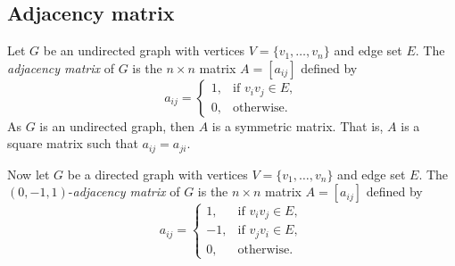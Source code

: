 \subsection{Adjacency matrix}

Let $G$ be an undirected graph with vertices
$V = \{ v_1, \dots, v_n \}$ and edge set $E$. The
\emph{adjacency matrix} of $G$ is the $n \times n$ matrix
$A = [a_{ij}]$ defined by
\[
a_{ij}
=
\begin{cases}
1, & \text{if $v_i v_j \in E$}, \\
0, & \text{otherwise}.
\end{cases}
\]
As $G$ is an undirected graph, then $A$ is a symmetric matrix. That
is, $A$ is a square matrix such that $a_{ij} = a_{ji}$.

Now let $G$ be a directed graph with vertices
$V = \{ v_1, \dots, v_n \}$ and edge set $E$. The
$(0, -1, 1)$-\emph{adjacency matrix} of $G$ is the $n \times n$ matrix
$A = [a_{ij}]$ defined by
\[
a_{ij}
=
\begin{cases}
1,  & \text{if $v_i v_j \in E$}, \\
-1, & \text{if $v_j v_i \in E$}, \\
0,  & \text{otherwise}.
\end{cases}
\]

